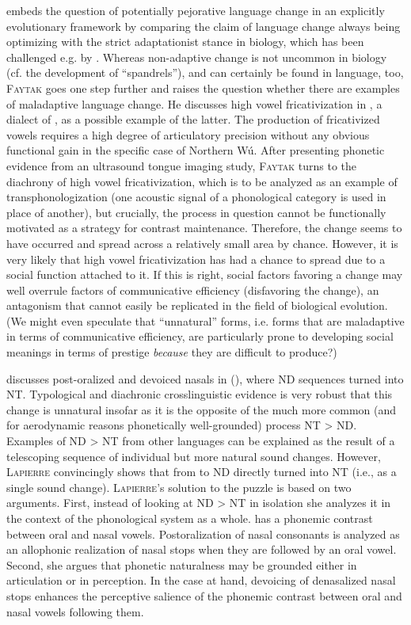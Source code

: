 \documentclass[output=paper,hidelinks]{langscibook}
\begin{document}
\textsc{} embeds the question of potentially pejorative language change in an explicitly evolutionary framework by comparing the claim of language change always being optimizing with the strict adaptationist stance in biology, which has been challenged e.g. by \citet{gould-lewontin}. Whereas non-adaptive change is not uncommon in biology (cf. the development of ``spandrels''), and can certainly be found in language, too, \textsc{Faytak} goes one step further and raises the question whether there are examples of maladaptive language change. He discusses high vowel fricativization in , a dialect of , as a possible example of the latter. The production of fricativized vowels requires a high degree of articulatory precision without any obvious functional gain in the specific case of Northern Wú. After presenting phonetic evidence from an ultrasound tongue imaging study, \textsc{Faytak} turns to the diachrony of high vowel fricativization, which is to be analyzed as an example of transphonologization (one acoustic signal of a phonological category is used in place of another), but crucially, the process in question cannot be functionally motivated as a strategy for contrast maintenance. Therefore, the change seems to have occurred and spread across a relatively small area by chance. However, it is very likely that high vowel fricativization has had a chance to spread due to a social function attached to it. If this is right, social factors favoring a change may well overrule factors of communicative efficiency (disfavoring the change), an antagonism that cannot easily be replicated in the field of biological evolution. (We might even speculate that ``unnatural'' forms, i.e. forms that are maladaptive in terms of communicative efficiency, are particularly prone to developing social meanings in terms of prestige \textit{because} they are difficult to produce?)

\textsc{} discusses post-oralized and devoiced nasals in  (), where ND sequences turned into NT. Typological and diachronic crosslinguistic evidence is very robust that this change is unnatural insofar as it is the opposite of the much more common (and for aerodynamic reasons phonetically well-grounded) process NT > ND. Examples of ND > NT from other languages can be explained as the result of a telescoping sequence of individual but more natural sound changes. However, \textsc{Lapierre} convincingly shows that from  to  ND directly turned into NT (i.e., as a single sound change). \textsc{Lapierre}'s solution to the puzzle is based on two arguments. First, instead of looking at ND > NT in isolation she analyzes it in the context of the  phonological system as a whole.  has a phonemic contrast between oral and nasal vowels. Postoralization of nasal consonants is analyzed as an allophonic realization of nasal stops when they are followed by an oral vowel. Second, she argues that phonetic naturalness may be grounded either in articulation or in perception. In the case at hand, devoicing of denasalized nasal stops enhances the perceptive salience of the phonemic contrast between oral and nasal vowels following them.
\end{document}

